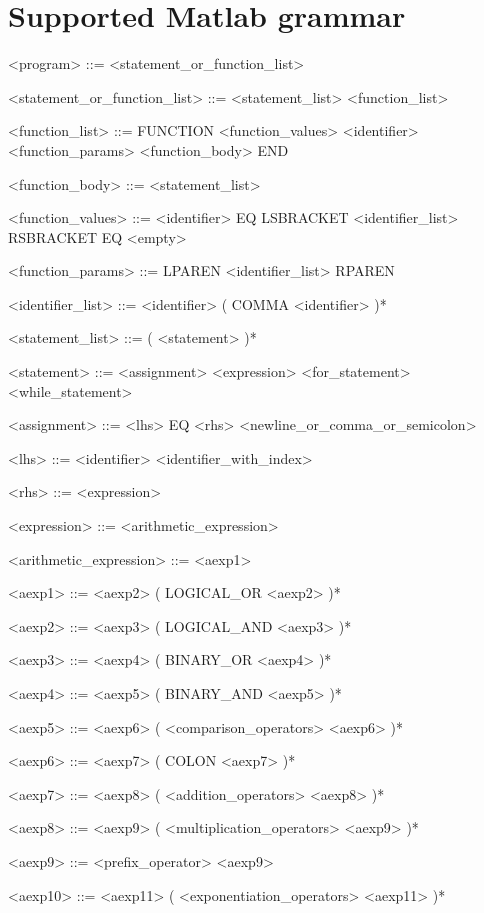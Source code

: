\documentclass{article}
\begin{document}
\section{Supported Matlab grammar}

\begin{grammar}
	<program> ::= <statement_or_function_list>
	
	<statement_or_function_list> ::= <statement_list> \alt <function_list>
	
	<function_list> ::= FUNCTION <function_values> <identifier> <function_params> <function_body> END
	
	<function_body> ::= <statement_list>
	
	<function_values> ::= <identifier> EQ \alt LSBRACKET <identifier_list> RSBRACKET EQ \alt <empty>
	
	<function_params> ::= LPAREN <identifier_list> RPAREN
	
	<identifier_list> ::= <identifier> ( COMMA <identifier> )*
	
	<statement_list> ::= ( <statement> )*
	
	<statement> ::= <assignment> \alt <expression> \alt <for_statement> \alt <while_statement>
	
	<assignment> ::= <lhs> EQ <rhs> <newline_or_comma_or_semicolon>
	
	<lhs> ::= <identifier> \alt <identifier_with_index>
	
	<rhs> ::= <expression>
	
	<expression> ::= <arithmetic_expression>
	
	<arithmetic_expression> ::= <aexp1>
	
	<aexp1> ::= <aexp2> ( LOGICAL_OR <aexp2> )*
	
	<aexp2> ::= <aexp3> ( LOGICAL_AND <aexp3> )*
	
	<aexp3> ::= <aexp4> ( BINARY_OR <aexp4> )*
	
	<aexp4> ::= <aexp5> ( BINARY_AND <aexp5> )*
	
	<aexp5> ::= <aexp6> ( <comparison_operators> <aexp6> )*
	
	<aexp6> ::= <aexp7> ( COLON <aexp7> )*
	
	<aexp7> ::= <aexp8> ( <addition_operators> <aexp8> )*
	
	<aexp8> ::= <aexp9> ( <multiplication_operators> <aexp9> )*
	
	<aexp9> ::= <prefix_operator> <aexp9> \alt <aexp10>
	
	<aexp10> ::= <aexp11> ( <exponentiation_operators> <aexp11> )*
	

\end{grammar}
\end{document}
